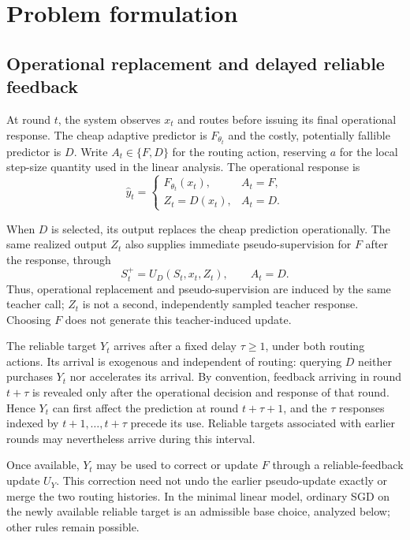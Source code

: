 \section{Problem formulation}

\subsection{Operational replacement and delayed reliable feedback}

At round $t$, the system observes $x_t$ and routes before issuing its final
operational response. The cheap adaptive predictor is $F_{\theta_t}$ and the
costly, potentially fallible predictor is $D$. Write $A_t\in\{F,D\}$ for
the routing action, reserving $a$ for the local step-size quantity used in
the linear analysis. The operational response is
\begin{equation}
    \widehat y_t=
    \begin{cases}
        F_{\theta_t}(x_t), & A_t=F,\\
        Z_t=D(x_t), & A_t=D.
    \end{cases}
\end{equation}

When $D$ is selected, its output replaces the cheap prediction
operationally. The same realized output $Z_t$ also supplies immediate
pseudo-supervision for $F$ after the response, through
\begin{equation}
    S_t^+=U_D(S_t,x_t,Z_t),
    \qquad A_t=D.
\end{equation}
Thus, operational replacement and pseudo-supervision are induced by the
same teacher call; $Z_t$ is not a second, independently sampled teacher
response. Choosing $F$ does not generate this teacher-induced update.

The reliable target $Y_t$ arrives after a fixed delay $\tau\geq1$, under
both routing actions. Its arrival is exogenous and independent of routing:
querying $D$ neither purchases $Y_t$ nor accelerates its arrival. By
convention, feedback arriving in round $t+\tau$ is revealed only after the
operational decision and response of that round. Hence $Y_t$ can first
affect the prediction at round $t+\tau+1$, and the $\tau$ responses indexed
by $t+1,\ldots,t+\tau$ precede its use. Reliable targets associated with
earlier rounds may nevertheless arrive during this interval.

Once available, $Y_t$ may be used to correct or update $F$ through a
reliable-feedback update $U_Y$. This correction need not undo the earlier
pseudo-update exactly or merge the two routing histories. In the minimal
linear model, ordinary SGD on the newly available reliable target is an
admissible base choice, analyzed below; other rules remain possible.

